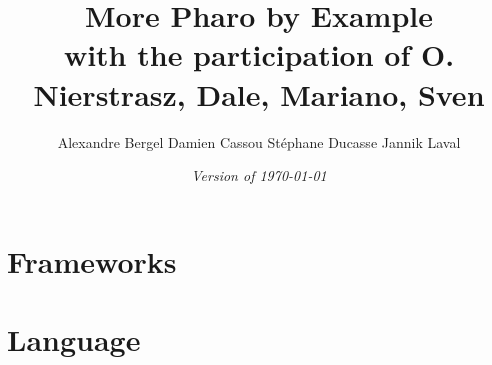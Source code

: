 \documentclass[a4paper,10pt,twoside]{book}
\begin{document}
\frontmatter
\setcounter{page}{1}
\pagestyle{headings}
\author{
	Alexandre Bergel\quad
	Damien Cassou\quad
	St\'ephane Ducasse\quad
	Jannik Laval\quad}
\title{\Huge\bf More Pharo by Example\\[1ex]
with the participation of O. Nierstrasz, Dale, Mariano, Sven }
\isodate
\date{\emph{Version of \today}}
\maketitle
\tableofcontents
\sloppy %
\mainmatter

%

% 


\part{Frameworks}














\part{Language}

\end{document}
